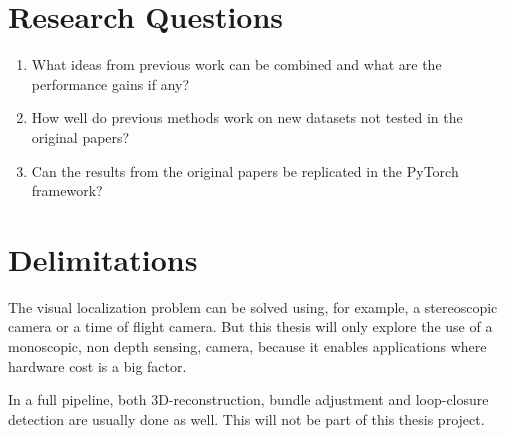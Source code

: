 \section{Research Questions}

\begin{enumerate}
	
	\item What ideas from previous work can be combined and what are the performance gains if any?
	\item How well do previous methods work on new datasets not tested in the original papers?
	\item Can the results from the original papers be replicated in the PyTorch framework?
	
\end{enumerate}

\section{Delimitations}

The visual localization problem can be solved using, for example, a stereoscopic camera or a time of flight camera. But this thesis will only explore the use of a monoscopic, non depth sensing, \abbrRGB camera, because it enables applications where hardware cost is a big factor.

In a full \abbrSFM pipeline, both 3D-reconstruction, bundle adjustment and loop-closure detection are usually done as well. This will not be part of this thesis project.